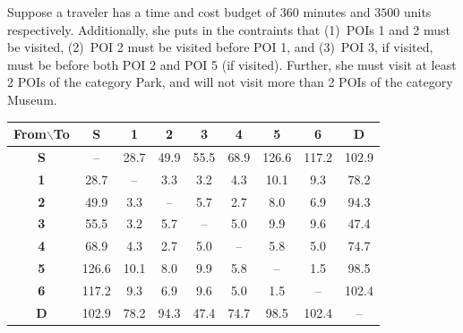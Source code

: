 Suppose a traveler has a time and cost budget of $360$ minutes and $3500$ units respectively.
Additionally, she puts in the contraints that (1)~POIs 1 and 2 must be visited, (2)~POI 2 must be visited before POI 1, and (3)~POI 3, if visited, must be before both POI 2 and POI 5 (if visited).
Further, she must visit at least 2 POIs of the category Park, and will not visit more than 2 POIs of the category Museum.

\begin{table}[t]
	\centering
	\resizebox{\columnwidth}{!}
	{
		\begin{tabular}{c|cccccccc}
			\toprule
			\textbf{From$\backslash$To} & \textbf{S} & \textbf{1} & \textbf{2} & \textbf{3} & \textbf{4} & \textbf{5} & \textbf{6} & \textbf{D} \\
			\midrule
			\textbf{S} & --    & 28.7  & 49.9  & 55.5  & 68.9  & 126.6 & 117.2 & 102.9 \\
			\textbf{1} & 28.7  & --    & 3.3   & 3.2   & 4.3   & 10.1  & 9.3   & 78.2  \\
			\textbf{2} & 49.9  & 3.3   & --    & 5.7   & 2.7   & 8.0   & 6.9   & 94.3  \\
			\textbf{3} & 55.5  & 3.2   & 5.7   & --    & 5.0   & 9.9   & 9.6   & 47.4  \\
			\textbf{4} & 68.9  & 4.3   & 2.7   & 5.0   & --    & 5.8   & 5.0   & 74.7  \\
			\textbf{5} & 126.6 & 10.1  & 8.0   & 9.9   & 5.8   & --    & 1.5   & 98.5  \\
			\textbf{6} & 117.2 & 9.3   & 6.9   & 9.6   & 5.0   & 1.5   & --    & 102.4 \\
			\textbf{D} & 102.9 & 78.2  & 94.3  & 47.4  & 74.7  & 98.5  & 102.4 & --    \\
			\bottomrule
		\end{tabular}
	}
	\label{tab:example_walk}
\end{table}

